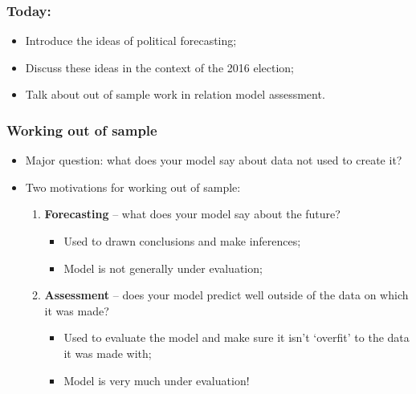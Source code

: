 \documentclass[aspectratio=169]{beamer}
\theoremstyle{principle}
\begin{document}
\begin{frame}
\frametitle{Today:}

\begin{itemize}
\item Introduce the ideas of political forecasting;
\bigskip
\bigskip
\bigskip

\item Discuss these ideas in the context of the 2016 election;
\bigskip
\bigskip
\bigskip

\item Talk about out of sample work in relation model assessment.

\end{itemize}

\end{frame}

\begin{frame}
\frametitle{Working out of sample}
\begin{itemize}
\item Major question: what does your model say about data not used to create it?
\bigskip
\bigskip
\bigskip

\item Two motivations for working out of sample:
\begin{enumerate}
\item \textbf{Forecasting} -- what does your model say about the future?
\begin{itemize}
\item Used to drawn conclusions and make inferences;
\item Model is not generally under evaluation;
\end{itemize}
\item \textbf{Assessment} -- does your model predict well outside of the data on which it was made?
\begin{itemize}
\item Used to evaluate the model and make sure it isn't `overfit' to the data it was made with;
\item Model is very much under evaluation!
\end{itemize}

\end{enumerate}

\end{itemize}

\end{frame}
\end{document}
